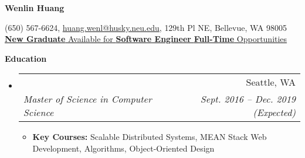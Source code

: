 \documentclass{article}
\makeatletter
\newcommand{\resitem}[1]{
    \item #1
    \vspace{-2pt}
}
\newcommand{\resheading}[1]{{\large \colorbox{mygrey}{\begin{minipage}{\textwidth}{\textbf{#1 \vphantom{p\^{E}}}}\end{minipage}}}}
\newcommand{\ressubheading}[4]{
\begin{tabular*}{6.80in}{l@{\extracolsep{\fill}}r}
    \textbf{#1} & #2 \\
    \textit{#3} & \textit{#4} \\
\end{tabular*}\vspace{-6pt}}
\makeatother
\begin{document}

    \centering\textbf{\huge Wenlin Huang}\\ \vspace{0.1in}

    (650) 567-6624,
    \href {mailto:huang.wenl@husky.neu.edu} {huang.wenl@husky.neu.edu},
    {129th Pl NE, Bellevue, WA 98005} \\

    {
        \underline{
            \textbf{New Graduate}
            Available for
            \textbf{Software Engineer}
            \textbf{Full-Time}
            Opportunities
        }
    }


    \resheading{Education}
    \begin{itemize}
        \item
        \ressubheading  %
        {\href
        {http://www.northeastern.edu}
        {Northeastern University}
        }
        {Seattle, WA}
        {Master of Science in Computer Science}
        {Sept. 2016 -- Dec. 2019 (Expected)}
        {\footnotesize
        \begin{itemize}
            \resitem
            {
            \textbf{Key Courses:} Scalable Distributed Systems, MEAN Stack Web Development,
            Algorithms, Object-Oriented Design
            }
        \end{itemize}
        }
    \end{itemize}
\end{document}
